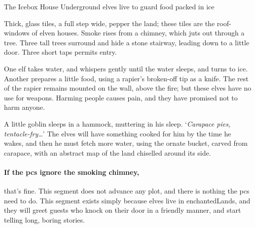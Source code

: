 {The Icebox House}%
{Underground elves live to guard food packed in ice}%
\label{iceboxHouse}


Thick, glass tiles, a full step wide, pepper the land; these tiles are the roof-windows of elven houses.%
Smoke rises from a chimney, which juts out through a tree.
Three tall trees surround and hide a stone stairway, leading down to a little door.
Three short taps permits entry.

\begin{boxtext}
  One elf takes water, and whispers gently until the water sleeps, and turns to ice.
  Another prepares a little food, using a rapier's broken-off tip as a knife.
  The rest of the rapier remains mounted on the wall, above the fire; but these elves have no use for weapons.
  Harming people causes pain, and they have promised not to harm anyone.
\end{boxtext}

A little goblin sleeps in a hammock, muttering in his sleep.
`\textit{Carapace pies, tentacle-fry\ldots}'
The elves will have something cooked for him by the time he wakes, and then he must fetch more water, using the ornate bucket, carved from carapace, with an abstract map of the land chiselled around its side.

\elf

\paragraph{If the \glspl{pc} ignore the smoking chimney,}
that's fine.
This \gls{segment} does not advance any plot, and there is nothing the \glspl{pc} need to do.
This \gls{segment} exists simply because elves live in \gls{enchantedLands}, and they will greet guests who knock on their door in a friendly manner, and start telling long, boring stories.

